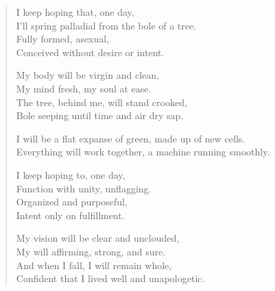 \begin{verse}
  I keep hoping that, one day,\\
  I'll spring palladial from the bole of a tree.\\
  Fully formed, asexual,\\
  Conceived without desire or intent.

  My body will be virgin and clean,\\
  My mind fresh, my soul at ease.\\
  The tree, behind me, will stand crooked,\\
  Bole seeping until time and air dry sap.

  I will be a flat expanse of green, made up of new cells.\\
  Everything will work together, a machine running smoothly.

  I keep hoping to, one day,\\
  Function with unity, unflagging.\\
  Organized and purposeful,\\
  Intent only on fulfillment.

  My vision will be clear and unclouded,\\
  My will affirming, strong, and sure.\\
  And when I fall, I will remain whole,\\
  Confident that I lived well and unapologetic.
\end{verse}
